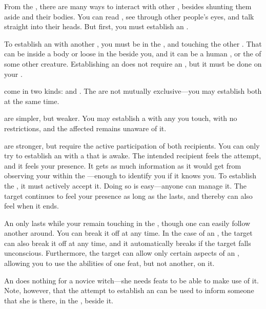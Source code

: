 From the {\mentalrealm}, there are many ways to interact with other {\minds}, besides shunting them aside and {\possessing} their bodies.
You can read {\minds}, see through other people's eyes, and talk straight into their heads.
But first, you must establish an {\interface}.

To establish an {\interface} with another {\mind}, you must be in the {\mentalrealm}, and touching the other {\mind}.
That {\mind} can be inside a body or loose in the {\mentalrealm} beside you, and it can be a human {\mind}, or the {\mind} of some other creature.
Establishing an {\interface} does not require an {\action}, but it must be done on your {\turn}.

\capital{\interfaces} come in two kinds: {\overtinterfaces} and {\subtleinterfaces}.
The {\interfaces} are not mutually exclusive---you may establish both at the same time.

\capital{\subtleinterfaces} are simpler, but weaker.
You may establish a {\subtleinterface} with any {\mind} you touch, with no restrictions, and the affected {\mind} remains unaware of it.

\capital{\overtinterfaces} are stronger, but require the active participation of both recipients.
You can only try to establish an {\overtinterface} with a {\mind} that is awake.
The intended recipient feels the attempt, and it feels your presence.
It gets as much information as it would get from observing your {\mind} within the {\mentalrealm}---enough to identify you if it knows you.
To establish the {\interface}, it must actively accept it.
Doing so is easy---anyone can manage it.
The target continues to feel your presence as long as the {\overtinterface} lasts, and thereby can also feel when it ends.

An {\interface} only lasts while your {\minds} remain touching in the {\mentalrealm}, though one {\mind} can easily follow another around.
You can break it off at any time.
In the case of an {\overtinterface}, the target can also break it off at any time, and it automatically breaks if the target falls unconscious.
Furthermore, the target can allow only certain aspects of an {\overtinterface}, allowing you to use the abilities of one feat, but not another, on it.

An {\interface} does nothing for a novice witch---she needs feats to be able to make use of it.
Note, however, that the attempt to establish an {\overtinterface} can be used to inform someone that she is there, in the {\mentalrealm}, beside it.

